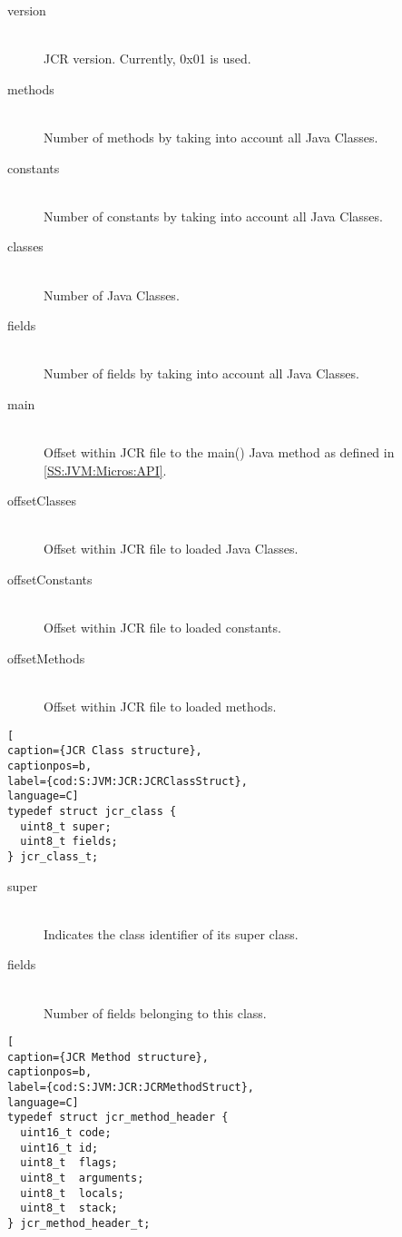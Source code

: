 \begin{description}
\item[version] \hfill \\
JCR version. Currently, 0x01 is used.
\item[methods] \hfill \\
Number of methods by taking into account all Java Classes.
\item[constants] \hfill \\
Number of constants by taking into account all Java Classes.
\item[classes] \hfill \\
Number of Java Classes.
\item[fields] \hfill \\
Number of fields by taking into account all Java Classes.
\item[main] \hfill \\
Offset within JCR file to the main() Java method as defined in \ref{SS:JVM:Micros:API}.
\item[offsetClasses] \hfill \\
Offset within JCR file to loaded Java Classes.
\item[offsetConstants] \hfill \\
Offset within JCR file to loaded constants.
\item[offsetMethods] \hfill \\
Offset within JCR file to loaded methods.
\end{description}

\begin{lstlisting}[
caption={JCR Class structure},
captionpos=b,
label={cod:S:JVM:JCR:JCRClassStruct},
language=C]
typedef struct jcr_class {
  uint8_t super;
  uint8_t fields;
} jcr_class_t;
\end{lstlisting}

\begin{description}
\item[super] \hfill \\
Indicates the class identifier of its super class.
\item[fields] \hfill \\
Number of fields belonging to this class.
\end{description}

\begin{lstlisting}[
caption={JCR Method structure},
captionpos=b,
label={cod:S:JVM:JCR:JCRMethodStruct},
language=C]
typedef struct jcr_method_header {
  uint16_t code;
  uint16_t id;
  uint8_t  flags;
  uint8_t  arguments;
  uint8_t  locals;
  uint8_t  stack;
} jcr_method_header_t;
\end{lstlisting}

